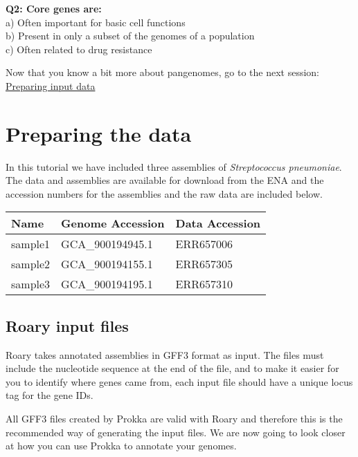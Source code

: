 \documentclass[11pt]{article}
\begin{document}
\textbf{Q2: Core genes are:}\\
a) Often important for basic cell functions\\
b) Present in only a subset of the genomes of a population\\
c) Often related to drug resistance

Now that you know a bit more about pangenomes, go to the next session:
\href{prepare_data.ipynb}{Preparing input data}





\newpage





    \hypertarget{preparing-the-data}{%
\section{Preparing the data}\label{preparing-the-data}}

In this tutorial we have included three assemblies of
\textit{Streptococcus pneumoniae}. The data and assemblies are available
for download from the ENA and the accession numbers for the assemblies
and the raw data are included below.

\begin{longtable}[]{@{}lll@{}}
\toprule
Name & Genome Accession & Data Accession \\
\midrule
\endhead
sample1 & GCA\_900194945.1 & ERR657006 \\
sample2 & GCA\_900194155.1 & ERR657305 \\
sample3 & GCA\_900194195.1 & ERR657310 \\
\bottomrule
\end{longtable}

\hypertarget{roary-input-files}{%
\subsection{Roary input files}\label{roary-input-files}}

Roary takes annotated assemblies in GFF3 format as input. The files must
include the nucleotide sequence at the end of the file, and to make it
easier for you to identify where genes came from, each input file should
have a unique locus tag for the gene IDs.

All GFF3 files created by Prokka are valid with Roary and therefore this
is the recommended way of generating the input files. We are now going
to look closer at how you can use Prokka to annotate your genomes.
\end{document}
